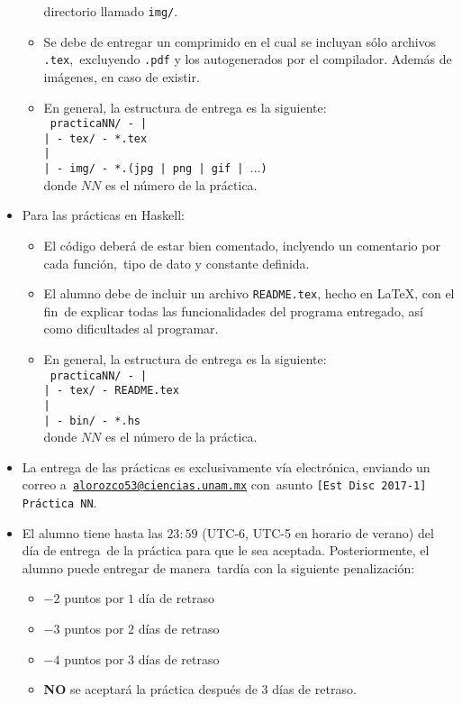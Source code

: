 \documentclass[paper=letter, fontsize=12pt]{scrartcl}
\begin{document}
\begin{itemize}
\begin{itemize}
    directorio llamado \texttt{img/}.
  \item Se debe de entregar un comprimido en el cual se incluyan sólo archivos \texttt{.tex},\
    excluyendo \texttt{.pdf} y los autogenerados por el compilador. Además de imágenes, en caso
    de existir.
  \item En general, la estructura de entrega es la siguiente:\\
    \texttt{
      practicaNN/ - |\\
      \hspace*{2.82 cm} | - tex/ - *.tex\\
      \hspace*{2.82 cm} |\\
      \hspace*{2.82 cm} | - img/ - *.(jpg | png | gif | $\ldots$)
    }\\
    donde $NN$ es el número de la práctica.
  \end{itemize}
\item Para las prácticas en Haskell:
  \begin{itemize}
  \item El código deberá de estar bien comentado, inclyendo un comentario por cada función,\
    tipo de dato y constante definida.
  \item El alumno debe de incluir un archivo \texttt{README.tex}, hecho en \LaTeX, con el fin\
    de explicar todas las funcionalidades del programa entregado, así como dificultades al
    programar.
  \item En general, la estructura de entrega es la siguiente:\\
    \texttt{
      practicaNN/ - |\\
      \hspace*{2.82 cm} | - tex/ - README.tex\\
      \hspace*{2.82 cm} |\\
      \hspace*{2.82 cm} | - bin/ - *.hs
    }\\
    donde $NN$ es el número de la práctica.
  \end{itemize}
\item La entrega de las prácticas es exclusivamente vía electrónica, enviando un correo a\
  \texttt{\href{mailto:alorozco53@ciencias.unam.mx}{alorozco53@ciencias.unam.mx}} con\
  asunto \texttt{[Est Disc 2017-1] Práctica NN}.
\item El alumno tiene hasta las $23:59$ (UTC-6, UTC-5 en horario de verano) del día de entrega\
  de la práctica para que le sea aceptada. Posteriormente, el alumno puede entregar de manera\
  tardía con la siguiente penalización:
  \begin{itemize}
  \item $-2$ puntos por $1$ día de retraso
  \item $-3$ puntos por $2$ días de retraso
  \item $-4$ puntos por $3$ días de retraso
  \item \textbf{NO} se aceptará la práctica después de 3 días de retraso.
  \end{itemize}
\end{itemize}
\end{document}
